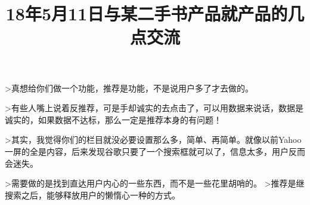 \documentclass{article}
\title{18年5月11日与某二手书产品就产品的几点交流}
\begin{document}
	>真想给你们做一个功能，推荐是功能，不是说用户多了才去做的。\par
	>有些人嘴上说着反推荐，可是手却诚实的去点击了，可以用数据来说话，数据是诚实的，如果数据不达标，那么一定是推荐本身的有问题！\par
	>其实，我觉得你们的栏目就没必要设置那么多，简单、再简单。就像以前Yahoo一屏的全是内容，后来发现谷歌只要了一个搜索框就可以了，信息太多，用户反而会迷失。\par
	>需要做的是找到直达用户内心的一些东西，而不是一些花里胡哨的。
	>推荐是继搜索之后，能够释放用户的懒惰心一种的方式。
\end{document}

